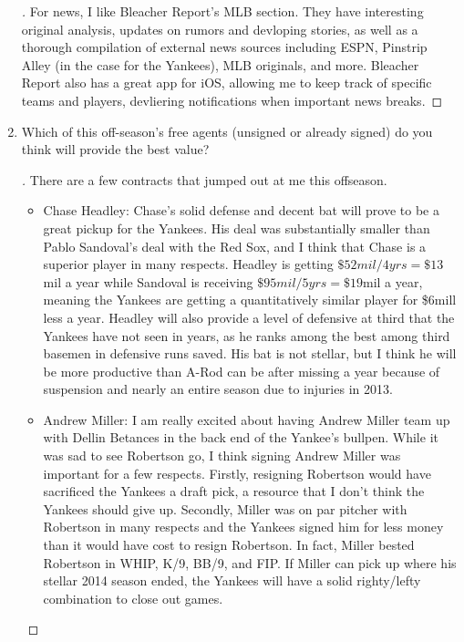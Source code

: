 \documentclass[]{article}
\theoremstyle{definition}
\begin{document}
\begin{enumerate}
\begin{proof}[\unskip\nopunct]
For news, I like Bleacher Report's MLB section. They have interesting original analysis, updates on rumors and devloping stories, as well as a thorough compilation of external news sources including ESPN, Pinstrip Alley (in the case for the Yankees), MLB originals, and more. Bleacher Report also has a great app for iOS, allowing me to keep track of specific teams and players, devliering notifications when important news breaks.
\end{proof}

\item Which of this off-season’s free agents (unsigned or already signed) do you think will provide the best value?

\begin{proof}[\unskip\nopunct]\renewcommand{\qedsymbol}{}
	There are a few contracts that jumped out at me this offseason.

	\begin{itemize}
		\item Chase Headley: Chase's solid defense and decent bat will prove to be a great pickup for the Yankees. His deal was substantially smaller than Pablo Sandoval's deal with the Red Sox, and I think that Chase is a superior player in many respects. Headley is getting $\$52mil/4yrs = \$13$mil a year while Sandoval is receiving $\$95mil/5yrs = \$19$mil a year, meaning the Yankees are getting a quantitatively similar player for \$6mill less a year. Headley will also provide a level of defensive at third that the Yankees have not seen in years, as he ranks among the best among third basemen in defensive runs saved. His bat is not stellar, but I think he will be more productive than A-Rod can be after missing a year because of suspension and nearly an entire season due to injuries in 2013.

		\item Andrew Miller: I am really excited about having Andrew Miller team up with Dellin Betances in the back end of the Yankee's bullpen. While it was sad to see Robertson go, I think signing Andrew Miller was important for a few respects. Firstly, resigning Robertson would have sacrificed the Yankees a draft pick, a resource that I don't think the Yankees should give up. Secondly, Miller was on par pitcher with Robertson in many respects and the Yankees signed him for less money than it would have cost to resign Robertson. In fact, Miller bested Robertson in WHIP, K/9, BB/9, and FIP. If Miller can pick up where his stellar 2014 season ended, the Yankees will have a solid righty/lefty combination to close out games. 


\end{itemize}
\end{proof}
\end{enumerate}
\end{document}
